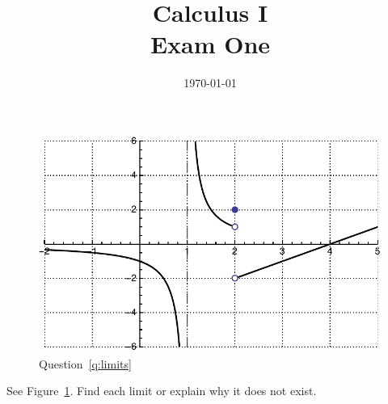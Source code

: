 \documentclass[letterpaper, landscape]{exam}
\title{Calculus I \\ Exam One}
\author{}
\date{\today}
\begin{document}
  \maketitle


  \begin{questions}

    \question 
    \label{q:limits}

      \begin{figure}[H]
        \centering
        \includegraphics[scale = 0.6]{limits.pdf}
        \caption{Question~\ref{q:limits}}
        \label{fig:limits}
      \end{figure}
      
      See Figure~\ref{fig:limits}. Find each limit or explain why it does not exist. 

\end{questions}
\end{document}
